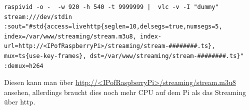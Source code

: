 \documentclass[12pt,a4paper,titlepage]{scrartcl} %
\begin{document}
\ttfamily
\begin{lstlisting}[breaklines]
raspivid -o -  -w 920 -h 540 -t 9999999 |  vlc -v -I "dummy" stream:///dev/stdin :sout="#std{access=livehttp{seglen=10,delsegs=true,numsegs=5, index=/var/www/streaming/stream.m3u8, index-url=http://<IPofRaspberryPi>/streaming/stream-########.ts}, mux=ts{use-key-frames}, dst=/var/www/streaming/stream-########.ts}" :demux=h264
\end{lstlisting}

\normalfont
Diesen kann man über \url{http://<IPofRaspberryPi>/streaming/stream.m3u8} ansehen, allerdings braucht dies noch mehr CPU auf dem Pi als das Streaming über http.
\end{document}
